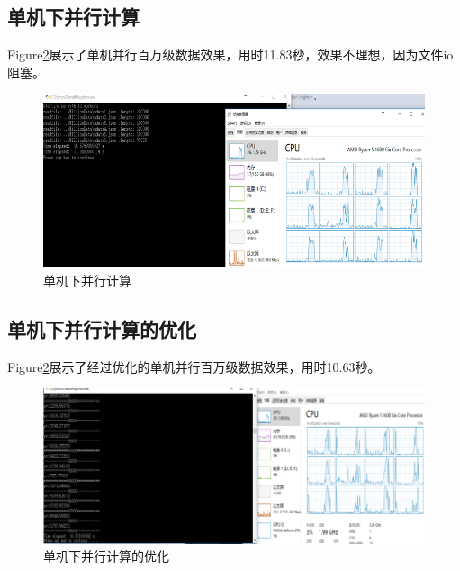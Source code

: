 \subsection{单机下并行计算}
Figure\ref{fig:sys.param}展示了单机并行百万级数据效果，用时11.83秒，效果不理想，因为文件io阻塞。
\begin{figure}[H]
\begin{center}
\includegraphics[width=16cm]{img//single_parallel.PNG}
\caption{单机下并行计算}
\label{fig:sys.param}
\end{center}
\end{figure}


\subsection{单机下并行计算的优化}
Figure\ref{fig:sys.param}展示了经过优化的单机并行百万级数据效果，用时10.63秒。
\begin{figure}[H]
\begin{center}
\includegraphics[width=16cm]{img//single_parallel_opt.PNG}
\caption{单机下并行计算的优化}
\label{fig:sys.param}
\end{center}
\end{figure}


